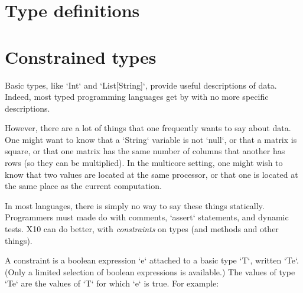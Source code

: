 \section{Type definitions}
\label{TypeDefs}




\section{Constrained types}
\label{ConstrainedTypes}
\label{DepType:DepType}
\label{DepTypes}



Basic types, like \xcd`Int` and \xcd`List[String]`, provide useful
descriptions of data.  Indeed, most typed programming languages get by with no
more specific descriptions.

However, there are a lot of things that one frequently wants to say about
data.  One might want to know that a \xcd`String` variable is not \xcd`null`,
or that a matrix is square, or that one matrix has the same number of columns
that another has rows (so they can be multiplied).  In the multicore setting,
one might wish to know that two values are located at the same processor, or
that one is located at the same place as the current computation.

In most languages, there is simply no way to say these things statically.
Programmers must made do with comments, \xcd`assert` statements, and dynamic
tests.  X10 can do better, with {\em constraints} on types (and methods and
other things).

A constraint is a boolean expression \xcd`e` attached to a basic type \xcd`T`,
written \xcd`T{e}`.  (Only a limited selection of boolean expressions is
available.)  The values of type \xcd`T{e}` are the values of \xcd`T` for which
\xcd`e` is true.  For example: 

